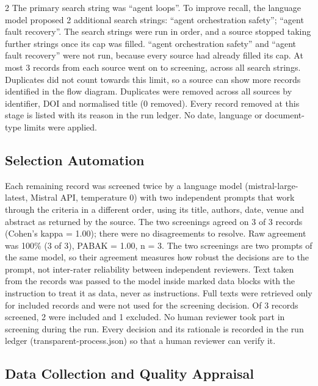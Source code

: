 \documentclass[10pt,a4paper]{article}
\begin{document}
\begin{multicols}{2}
The primary search string was ``agent loops''.
To improve recall, the language model proposed 2 additional search strings: ``agent orchestration safety''; ``agent fault recovery''.
The search strings were run in order, and a source stopped taking further strings once its cap was filled.
``agent orchestration safety'' and ``agent fault recovery'' were not run, because every source had already filled its cap.
At most 3 records from each source went on to screening, across all search strings.
Duplicates did not count towards this limit, so a source can show more records identified in the flow diagram.
Duplicates were removed across all sources by identifier, DOI and normalised title (0 removed).
Every record removed at this stage is listed with its reason in the run ledger.
No date, language or document-type limits were applied.

\subsection{Selection Automation}\label{sec:selection-automation}

Each remaining record was screened twice by a language model (mistral-large-latest, Mistral API, temperature 0) with two independent prompts that work through the criteria in a different order, using its title, authors, date, venue and abstract as returned by the source.
The two screenings agreed on 3 of 3 records (Cohen's kappa = 1.00); there were no disagreements to resolve.
Raw agreement was 100\% (3 of 3), PABAK = 1.00, n = 3.
The two screenings are two prompts of the same model, so their agreement measures how robust the decisions are to the prompt, not inter-rater reliability between independent reviewers.
Text taken from the records was passed to the model inside marked data blocks with the instruction to treat it as data, never as instructions.
Full texts were retrieved only for included records and were not used for the screening decision.
Of 3 records screened, 2 were included and 1 excluded.
No human reviewer took part in screening during the run.
Every decision and its rationale is recorded in the run ledger (transparent-process.\allowbreak{}json) so that a human reviewer can verify it.

\subsection{Data Collection and Quality Appraisal}\label{sec:data-collection-and-quality-appraisal}


\end{multicols}
\end{document}
